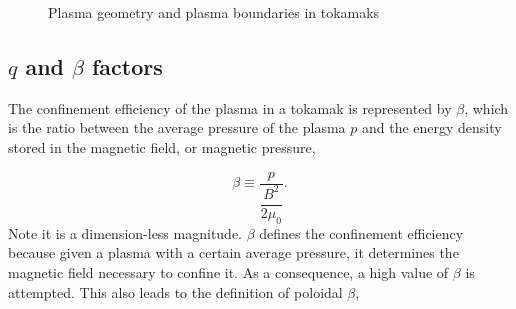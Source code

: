 \documentclass[a4paper,12pt,oneside]{book}
\begin{document}



\begin{figure}[t]
	\centering
	\hfill
	\caption{Plasma geometry and plasma boundaries in tokamaks}
\label{plasma geom}
\end{figure}
\subsection{$q$ and $\beta$ factors}
\label{section q beta}
The confinement efficiency of the plasma in a tokamak is represented by $\beta$, which is the ratio between the average pressure of the plasma $p$ and the energy density stored in the magnetic field, or magnetic pressure,

\begin{equation} \label{def beta}
\beta \equiv \dfrac{p}{\dfrac{B^2}{2 \mu_{0}}}.
\end{equation}
%
Note it is a dimension-less magnitude. $\beta$ defines the confinement efficiency because given a plasma with a certain average pressure, it determines the magnetic field necessary to confine it. As a consequence, a high value of $\beta$ is attempted. This also leads to the definition of poloidal $\beta$,
\end{document}

